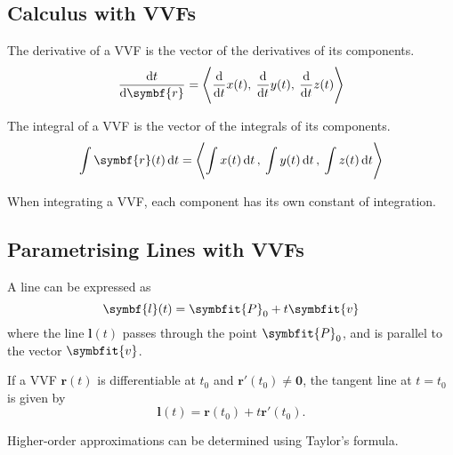 \documentclass{article}
\begin{document}
\subsection{Calculus with VVFs}
\begin{theorem}
    The derivative of a VVF is the vector of the derivatives of its components.
    \begin{equation*}
        \dv{t}\symbf{r}(t) = \avec[\Bigg]{\dv{t}x(t),\: \dv{t}y(t),\: \dv{t}z(t)}
    \end{equation*}
\end{theorem}
\begin{theorem}
    The integral of a VVF is the vector of the integrals of its components.
    \begin{equation*}
        \int\symbf{r}(t)\dd{t}
        = \avec[\Bigg]{\int x(t) \dd{t},\: \int y(t) \dd{t},\: \int z(t) \dd{t}}
    \end{equation*}
\end{theorem}
\begin{remark}
    When integrating a VVF, each component has its own constant of integration.
\end{remark}
\subsection{Parametrising Lines with VVFs}
\begin{definition}
    A line can be expressed as
    \begin{equation*}
        \symbf{l}(t) = \symbfit{P}_0 + t\symbfit{v}
    \end{equation*}
    where the line $\symbf{l}(t)$ passes through the point $\symbfit{P}_0$, and is parallel to the vector $\symbfit{v}$.
\end{definition}
\begin{definition}
    If a VVF $\symbf{r}(t)$ is differentiable at
    $t_0$ and $\symbf{r'}(t_0)\ne\symbf{0}$, the tangent line at
    $t=t_0$ is given by
    \begin{equation*}
        \symbf{l}(t) = \symbf{r}(t_0)+t\symbf{r'}(t_0).
    \end{equation*}
\end{definition}
\begin{remark}
    Higher-order approximations can be determined using Taylor's formula.
\end{remark}
\end{document}
